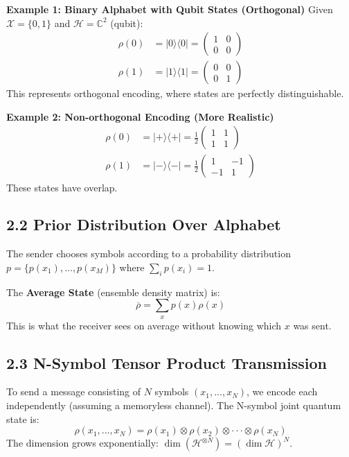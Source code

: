 \documentclass[12pt, a4paper]{article}
\begin{document}
\textbf{Example 1: Binary Alphabet with Qubit States (Orthogonal)}
Given $\mathcal{X}=\{0,1\}$ and $\mathcal{H}=\mathbb{C}^{2}$ (qubit):
\begin{align}
\rho(0) &= |0\rangle\langle0| = \begin{pmatrix}1&0\\ 0&0\end{pmatrix} \\
\rho(1) &= |1\rangle\langle1| = \begin{pmatrix}0&0\\ 0&1\end{pmatrix}
\end{align}
This represents orthogonal encoding, where states are perfectly distinguishable.

\textbf{Example 2: Non-orthogonal Encoding (More Realistic)}
\begin{align}
\rho(0) &= |+\rangle\langle+| = \frac{1}{2}\begin{pmatrix}1&1\\ 1&1\end{pmatrix} \\
\rho(1) &= |-\rangle\langle-| = \frac{1}{2}\begin{pmatrix}1&-1\\ -1&1\end{pmatrix}
\end{align}
These states have overlap.

\subsection{2.2 Prior Distribution Over Alphabet}
The sender chooses symbols according to a probability distribution $p=\{p(x_{1}),...,p(x_{M})\}$ where $\sum_{i}p(x_{i})=1$.

The \textbf{Average State} (ensemble density matrix) is:
\begin{equation}
\overline{\rho}=\sum_{x}p(x)\rho(x)
\end{equation}
This is what the receiver sees on average without knowing which $x$ was sent.

\subsection{2.3 N-Symbol Tensor Product Transmission}
To send a message consisting of $N$ symbols $(x_{1},...,x_{N})$, we encode each independently (assuming a memoryless channel). The N-symbol joint quantum state is:
\begin{equation}
\rho(x_{1},...,x_{N})=\rho(x_{1})\otimes\rho(x_{2})\otimes\cdot\cdot\cdot\otimes\rho(x_{N})
\end{equation}
The dimension grows exponentially: $\dim(\mathcal{H}^{\otimes N})=(\dim\mathcal{H})^{N}$.
\end{document}
